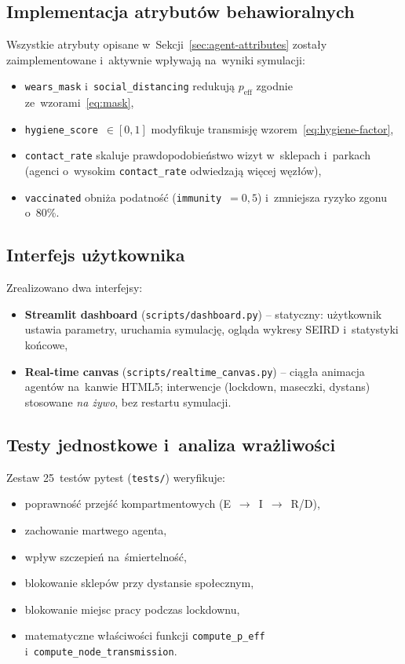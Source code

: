 \documentclass[polish]{projectreport}
\begin{document}
\subsection{Implementacja atrybutów behawioralnych}
\label{sec:behavioral-impl}

Wszystkie atrybuty opisane w~Sekcji~\ref{sec:agent-attributes} zostały
zaimplementowane i~aktywnie wpływają na~wyniki symulacji:

\begin{itemize}
  \item \texttt{wears\_mask} i~\texttt{social\_distancing} redukują
        $p_{\text{eff}}$ zgodnie ze~wzorami~\eqref{eq:mask},
  \item \texttt{hygiene\_score}~$\in [0,1]$ modyfikuje transmisję
        wzorem~\eqref{eq:hygiene-factor},
  \item \texttt{contact\_rate} skaluje prawdopodobieństwo wizyt w~sklepach
        i~parkach (agenci o~wysokim \texttt{contact\_rate} odwiedzają więcej węzłów),
  \item \texttt{vaccinated} obniża podatność (\texttt{immunity}~$=0{,}5$)
        i~zmniejsza ryzyko zgonu o~80\%.
\end{itemize}

\subsection{Interfejs użytkownika}
\label{sec:ui}

Zrealizowano dwa interfejsy:
\begin{itemize}
  \item \textbf{Streamlit dashboard} (\texttt{scripts/dashboard.py}) --
        statyczny: użytkownik ustawia parametry, uruchamia symulację, ogląda
        wykresy SEIRD i~statystyki końcowe,
  \item \textbf{Real-time canvas} (\texttt{scripts/realtime\_canvas.py}) --
        ciągła animacja agentów na~kanwie HTML5; interwencje (lockdown, maseczki,
        dystans) stosowane \emph{na żywo}, bez restartu symulacji.
\end{itemize}

\subsection{Testy jednostkowe i~analiza wrażliwości}
\label{sec:tests}

Zestaw 25~testów pytest (\texttt{tests/}) weryfikuje:
\begin{itemize}
  \item poprawność przejść kompartmentowych (E~$\to$~I~$\to$~R/D),
  \item zachowanie martwego agenta,
  \item wpływ szczepień na~śmiertelność,
  \item blokowanie sklepów przy dystansie społecznym,
  \item blokowanie miejsc pracy podczas lockdownu,
  \item matematyczne właściwości funkcji \texttt{compute\_p\_eff}
        i~\texttt{compute\_node\_transmission}.
\end{itemize}
\end{document}

